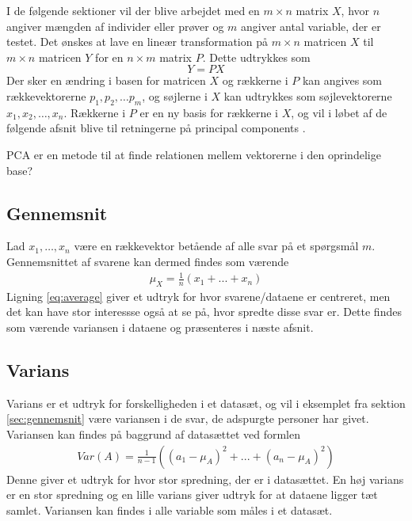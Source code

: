 I de følgende sektioner vil der blive arbejdet med en $m \times n$ matrix $X$, hvor $n$ angiver mængden af individer eller prøver og $m$ angiver antal variable, der er testet. Det ønskes at lave en lineær transformation på $m \times n$ matricen $X$ til $m \times n$ matricen $Y$ for en $n \times m$ matrix $P$. Dette udtrykkes som
\begin{equation}
Y=PX
\end{equation}
Der sker en ændring i basen for matricen $X$ og rækkerne i $P$ kan angives som rækkevektorerne $p_1,p_2,…p_m$, og søjlerne i $X$ kan udtrykkes som søjlevektorerne $x_1,x_2,…,x_n$. Rækkerne i $P$ er en ny basis for rækkerne i $X$, og vil i løbet af de følgende afsnit blive til retningerne på principal components . 

PCA er en metode til at finde relationen mellem vektorerne i den oprindelige base?

\subsection{Gennemsnit} \label{sec:gennemsnit}
Lad $x_1,…,x_n$ være en rækkevektor betående af alle svar på et spørgsmål $m$. Gennemsnittet af svarene kan dermed findes som værende
\begin{align}
\mu_X = \frac{1}{n}(x_1+ ... + x_n)
\label{eq:average}
\end{align}
Ligning \ref{eq:average} giver et udtryk for hvor svarene/dataene er centreret, men det kan have stor interessse også at se på, hvor spredte disse svar er. Dette findes som værende variansen i dataene og præsenteres i næste afsnit.

\subsection{Varians}
Varians er et udtryk for forskelligheden i et datasæt, og vil i eksemplet fra sektion \vref{sec:gennemsnit} være variansen i de svar, de adspurgte personer har givet. Variansen kan findes på baggrund af datasættet ved formlen
\begin{align}
Var(A)= \frac{1}{n - 1}((a_1 - \mu_A)^2 + ... + (a_n - \mu_A)^2)
\label{eq:varians}
\end{align}
Denne giver et udtryk for hvor stor spredning, der er i datasættet. En høj varians er en stor spredning og en lille varians giver udtryk for at dataene ligger tæt samlet. Variansen kan findes i alle variable som måles i et datasæt.


